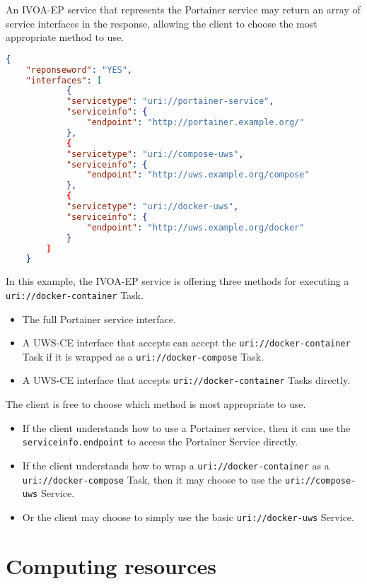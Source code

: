 \documentclass[11pt,a4paper]{ivoa}
\newcommand{\uwsce} {UWS-CE\xspace}
\newcommand{\ivoep} {IVOA-EP\xspace}
\newcommand{\portainer} {Portainer\xspace}
\newcommand{\codeword}[1] {\texttt{#1}}
\begin{document}
An \ivoep service that represents the \portainer service may return an array of service interfaces in the response, allowing the client to choose the most appropriate method to use.
\begin{lstlisting}[language=json]
    {
    "reponseword": "YES",
    "interfaces": [
            {
            "servicetype": "uri://portainer-service",
            "serviceinfo": {
                "endpoint": "http://portainer.example.org/"
            },
            {
            "servicetype": "uri://compose-uws",
            "serviceinfo": {
                "endpoint": "http://uws.example.org/compose"
            },
            {
            "servicetype": "uri://docker-uws",
            "serviceinfo": {
                "endpoint": "http://uws.example.org/docker"
            }
        ]
    }
\end{lstlisting}

In this example, the \ivoep service is offering three methods for executing a \codeword{uri://docker-container} Task.
\begin{itemize}
    \item The full \portainer service interface.
    \item A \uwsce interface that accepts can accept the \codeword{uri://docker-container} Task if it is wrapped as a \codeword{uri://docker-compose} Task.
    \item A \uwsce interface that accepts \codeword{uri://docker-container} Tasks directly.
\end{itemize}

The client is free to choose which method is most appropriate to use.
\begin{itemize}
    \item If the client understands how to use a \portainer service, then it can use the \codeword{serviceinfo.endpoint} to access the \portainer Service directly.
    \item If the client understands how to wrap a \codeword{uri://docker-container} as a \codeword{uri://docker-compose} Task, then it may choose to use the \codeword{uri://compose-uws} Service.
    \item Or the client may choose to simply use the basic \codeword{uri://docker-uws} Service.
\end{itemize}


\section{Computing resources}
\label{sec:computing-resources}
\end{document}
